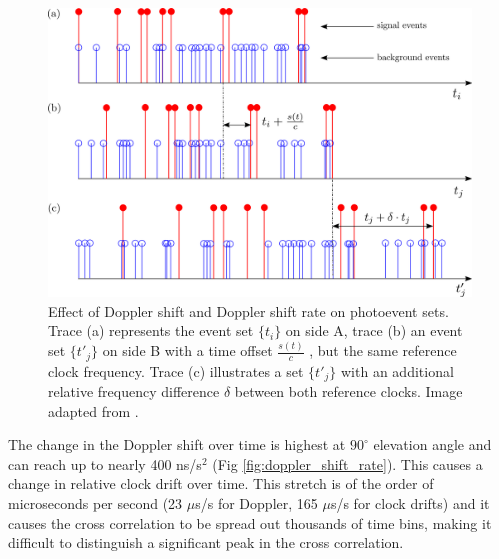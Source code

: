 \begin{figure}[ht!]
	\centering
	\includegraphics[width=0.95\linewidth]{assets/correlation_smear.png}
	\caption{Effect of Doppler shift and Doppler shift rate on photoevent sets. Trace (a) represents the event set $\{t_i\}$ on side  A, trace (b) an event  set $\{t′_j\}$ on side B  with a time offset $\frac{s(t)}{c}$ , but  the  same reference clock frequency. Trace (c) illustrates a set $\{t'_j\}$ with an additional relative frequency difference $\delta$ between both reference clocks. Image adapted from \cite{ho2009clock}.}
	\label{fig:correlation_smear}
\end{figure}

The change in the Doppler shift over time is highest at $90^\circ$ elevation angle and can reach up to nearly 400 ns/s$^2$ (Fig \ref{fig:doppler_shift_rate}). This causes a change in relative clock drift over time. This stretch is of the order of microseconds per second (23 $\mu$s/s for Doppler, 165 $\mu$s/s for clock drifts) and it causes the cross correlation to be spread out thousands of time bins, making it difficult to distinguish a significant peak in the cross correlation.

